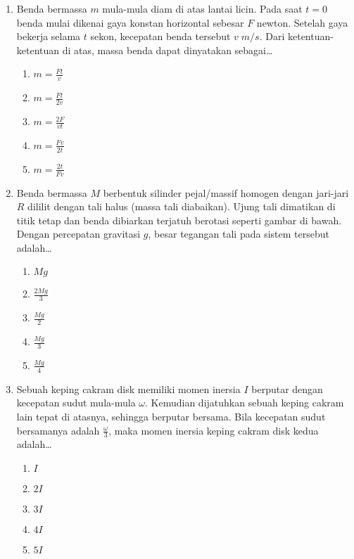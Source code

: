 \documentclass[A4,12PT, english, twocolumn]{journal}
\begin{document}
\begin{enumerate}
\item Benda bermassa $m$ mula-mula diam di atas lantai licin. Pada saat $t=0$ benda mulai dikenai gaya konstan horizontal sebesar $F$ newton. Setelah gaya bekerja selama $t$ sekon, kecepatan benda tersebut $v \; m/s$. Dari ketentuan-ketentuan di atas, massa benda dapat dinyatakan sebagai\dots
    \begin{enumerate}
        \item $m=\frac{Ft}{v}$
        \item $m=\frac{Ft}{2v}$
        \item $m=\frac{2F}{vt}$
        \item $m=\frac{Fv}{2t}$
        \item $m=\frac{2t}{Fv}$
    \end{enumerate}

\item Benda bermassa $M$ berbentuk silinder pejal/massif homogen dengan jari-jari $R$ dililit dengan tali halus (massa tali diabaikan). Ujung tali dimatikan di titik tetap dan benda dibiarkan terjatuh berotasi seperti gambar di bawah. Dengan percepatan gravitasi $g$, besar tegangan tali pada sistem tersebut adalah\dots
\begin{center}
\end{center}
    \begin{enumerate}
        \item $Mg$
        \item $\frac{2Mg}{3}$
        \item $\frac{Mg}{2}$
        \item $\frac{Mg}{3}$
        \item $\frac{Mg}{4}$
    \end{enumerate}

\item Sebuah keping cakram disk memiliki momen inersia $I$ berputar dengan kecepatan sudut mula-mula $\omega$. Kemudian dijatuhkan sebuah keping cakram lain tepat di atasnya, sehingga berputar bersama. Bila kecepatan sudut bersamanya adalah $\frac{\omega}{3}$, maka momen inersia keping cakram disk kedua adalah\dots
    \begin{enumerate}
        \item $I$
        \item $2I$
        \item $3I$
        \item $4I$
        \item $5I$
    \end{enumerate}
    

\end{enumerate}
\end{document}
